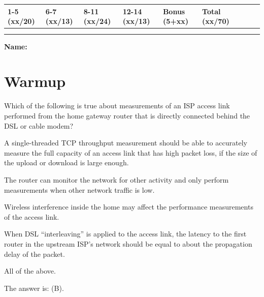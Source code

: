 \documentclass[11pt]{article}
\newcounter{partctr}
\newcommand{\allapply}{\probnote{Circle ALL that apply}}
\newcommand{\sols}[1]{#1}
\newcommand{\sols}[1]{}
\begin{document}
\begin{center}
\begin{tabular}{|l|l|l|l|l|l|l|l|l|} \hline \hline
{\bf 1-5 (xx/20)}& {\bf 6-7 (xx/13)} & {\bf 8-11 (xx/24)} & {\bf 12-14
  (xx/13)} &{\bf Bonus (5+xx)} & {\bf Total 
  (xx/70)}  \\ \hline 
 & & & & & \\ 
 & & & & & \\ \hline \hline
\end{tabular}
\end{center}

\vspace{.2in}
{\bf\Large{Name:}}

\newpage
\pagestyle{fancy}

\section{Warmup}

 Which of the following is true about measurements of an ISP
access link performed from the home gateway router that is directly
connected behind the DSL or cable modem? 
\allapply

\setcounter{partctr}{0}
\begin{list}{\bf{}.}{}
\item A single-threaded TCP throughput measurement should be able to
  accurately measure the full capacity of an access link that has high
  packet loss, if the size of the upload or download is large enough.
\item The router can monitor the network for other activity and only
  perform measurements when other network traffic is low.
\item Wireless interference inside the home may affect the performance
  measurements of the access link.
\item When DSL ``interleaving'' is applied to the access link,
  the latency to the first router in the upstream ISP's network
  should be equal to about the propagation delay of the packet.
\item All of the above.
\end{list}
\eprob

\sols{
\begin{answer}
The answer is: (B).
\end{answer}
}
\end{document}
